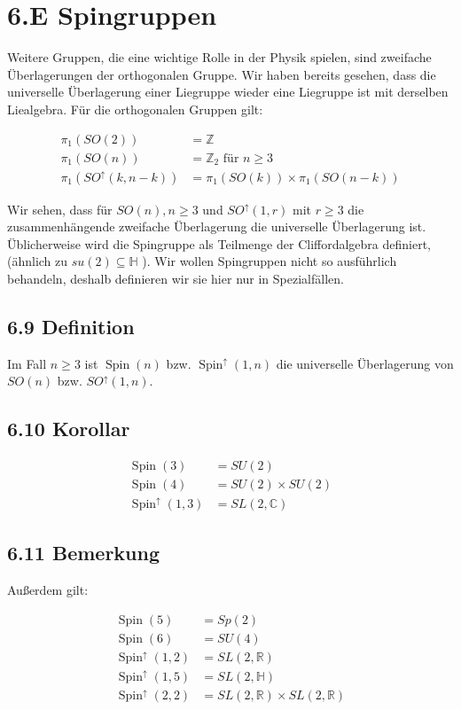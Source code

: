 \documentclass[10pt, letterpaper]{article}
\begin{document}
\section*{6.E Spingruppen}
Weitere Gruppen, die eine wichtige Rolle in der Physik spielen, sind zweifache Überlagerungen der orthogonalen Gruppe. Wir haben bereits gesehen, dass die universelle Überlagerung einer Liegruppe wieder eine Liegruppe ist mit derselben Liealgebra. Für die orthogonalen Gruppen gilt:

$$
\begin{aligned}
\pi_{1}(S O(2)) & =\mathbb{Z} \\
\pi_{1}(S O(n)) & =\mathbb{Z}_{2} \text { für } n \geq 3 \\
\pi_{1}\left(S O^{\uparrow}(k, n-k)\right) & =\pi_{1}(S O(k)) \times \pi_{1}(S O(n-k))
\end{aligned}
$$

Wir sehen, dass für $S O(n), n \geq 3$ und $S O^{\uparrow}(1, r)$ mit $r \geq 3$ die zusammenhängende zweifache Überlagerung die universelle Überlagerung ist. Üblicherweise wird die Spingruppe als Teilmenge der Cliffordalgebra definiert, (ähnlich zu $s u(2) \subseteq \mathbb{H}$ ). Wir wollen Spingruppen nicht so ausführlich behandeln, deshalb definieren wir sie hier nur in Spezialfällen.

\subsection*{6.9 Definition}
Im Fall $n \geq 3$ ist $\operatorname{Spin}(n)$ bzw. $\operatorname{Spin}^{\uparrow}(1, n)$ die universelle Überlagerung von $S O(n)$ bzw. $S O^{\uparrow}(1, n)$.

\subsection*{6.10 Korollar}
$$
\begin{aligned}
\operatorname{Spin}(3) & =S U(2) \\
\operatorname{Spin}(4) & =S U(2) \times S U(2) \\
\operatorname{Spin}^{\uparrow}(1,3) & =S L(2, \mathbb{C})
\end{aligned}
$$

\subsection*{6.11 Bemerkung}
Außerdem gilt:

$$
\begin{aligned}
\operatorname{Spin}(5) & =S p(2) \\
\operatorname{Spin}(6) & =S U(4) \\
\operatorname{Spin}^{\uparrow}(1,2) & =S L(2, \mathbb{R}) \\
\operatorname{Spin}^{\uparrow}(1,5) & =S L(2, \mathbb{H}) \\
\operatorname{Spin}^{\uparrow}(2,2) & =S L(2, \mathbb{R}) \times S L(2, \mathbb{R})
\end{aligned}
$$
\end{document}
